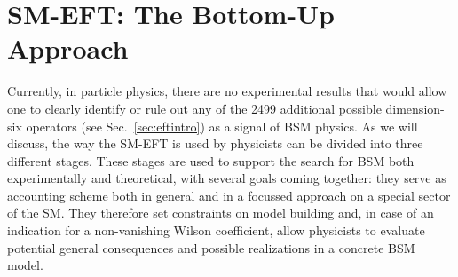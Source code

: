 
\section{SM-EFT: The Bottom-Up Approach}
\label{sec:classification}

Currently, in particle physics, there are no experimental results that would allow one to clearly identify or rule out any of the 2499 additional possible dimension-six operators (see Sec.~\ref{sec:eftintro}) as a signal of BSM physics. 
As we will discuss, the way the SM-EFT is used by physicists can be divided into three different stages.
These stages are used to support the search for BSM both experimentally and theoretical,
with several goals coming together: they serve as accounting scheme both in general and in a
focussed approach on a special sector of the SM. 
They therefore set constraints on model building and, in case of an indication for a non-vanishing
Wilson coefficient, allow physicists to evaluate potential general consequences and possible 
realizations in a concrete BSM model.

